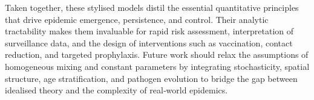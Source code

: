 \documentclass[11pt]{article}
\begin{document}
Taken together, these stylised models distil the essential quantitative
principles that drive epidemic emergence, persistence, and control. Their
analytic tractability makes them invaluable for rapid risk assessment,
interpretation of surveillance data, and the design of interventions such as
vaccination, contact reduction, and targeted prophylaxis. Future work should
relax the assumptions of homogeneous mixing and constant parameters by
integrating stochasticity, spatial structure, age stratification, and pathogen
evolution to bridge the gap between idealised theory and the complexity of
real‐world epidemics.


\newpage


\end{document}
